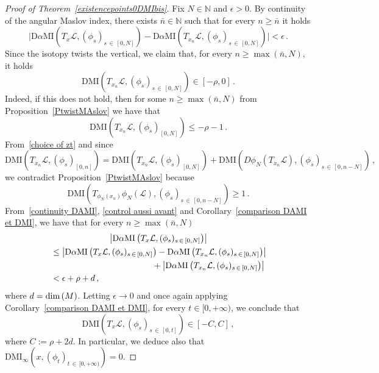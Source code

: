 \documentclass[AHL, Unicode, longabstracts, published]{cedram}
\newcommand*\cl{\mathcal{L}}
\newcommand{\DMI}{\mathrm{DMI}}
\newcommand{\MI}{\mathrm{MI}}
\newcommand{\rmD}{\mathrm{D}}
\newcommand*\N{\mathbb{N}}
\renewcommand*\dim{{\rm dim}\,}
\begin{document}
\begin{proof}[Proof of Theorem~\ref{existencepoints0DMIbis}]
Fix $N\in\N$ and $\epsilon>0$. By continuity of the angular Maslov index, there exists $\bar n\in\N$ such that for every $n\geq\bar n$ it holds
\begin{equation}\label{continuity DAMI}
\Big\vert \rmD\alpha\MI\left(T_{ x}\cl, (\phi_s)_{s\,\in\,[0,N]}\right) - \rmD\alpha\MI\left(T_{x_n}\cl, (\phi_s)_{s\,\in\,[0,N]}\right) \Big\vert<\epsilon\,.
\end{equation}
Since the isotopy twists the vertical, we claim that, for every $n\geq \max (\bar n, N)$, it holds
\begin{equation}\label{control aussi avant}
\DMI\left(T_{x_n}\cl,(\phi_s)_{s\,\in\,[0,N]}\right)\in[-\rho, 0]\,.
\end{equation}
Indeed, if this does not hold, then for some $n\geq \max(\bar n, N)$ from Proposition~\ref{PtwistMAslov} we have that
\[
\DMI\left(T_{x_n}\cl,(\phi_s)_{[0,N]}\right)\leq -\rho-1\,.
\]
From~\eqref{choice of zt} and since
\[
\DMI\left(T_{x_n}\cl,(\phi_s)_{[0,n]}\right)=\DMI\left(T_{x_n}\cl,(\phi_s)_{[0,N]}\right)+\DMI\left(D\phi_N\left(T_{x_n}\cl\right),(\phi_s)_{s\,\in\,[0,n-N]}\right)\,,
\]
we contradict Proposition~\ref{PtwistMAslov} because
\[
\DMI\left(T_{\phi_N(x_n)}\phi_N(\cl),(\phi_s)_{s\,\in\,[0,n-N]}\right)\geq 1\,.
\]
From~\eqref{continuity DAMI}, \eqref{control aussi avant} and Corollary~\ref{comparison DAMI et DMI}, we have that for every $n\geq\max(\bar n, N)$
\begin{multline*}
\left\vert \rmD\alpha\MI\left(T_{x}\cl,(\phi_s)_{s\,\in\,[0,N]}\right) \right\vert\\
\begin{aligned}
&\leq\left\vert \rmD\alpha\MI\left(T_{ x}\cl,(\phi_s)_{s\,\in\,[0,N]}\right) -\rmD\alpha\MI\left(T_{x_n}\cl, (\phi_s)_{s\,\in\,[0,N]}\right)\right\vert\\
&\mkern215mu + \left\vert \rmD\alpha\MI\left(T_{x_n}\cl, (\phi_s)_{s\,\in\,[0,N]}\right)\right\vert\\
&<\epsilon+\rho+d\,,
\end{aligned}
\end{multline*}
where $d=\dim(M)$. Letting $\epsilon\to 0$ and once again applying Corollary~\ref{comparison DAMI et DMI}, for every $t\in[0,+\infty)$, we conclude that
\[
\DMI\left(T_x\cl,(\phi_s)_{s\,\in\,[0,t]}\right)\in[-C,C]\,,
\]
where $C:= \rho+2d$. In particular, we deduce also that $\DMI_\infty(x,(\phi_t)_{t\,\in\,[0,+\infty)})=0$.
\end{proof}
\end{document}
